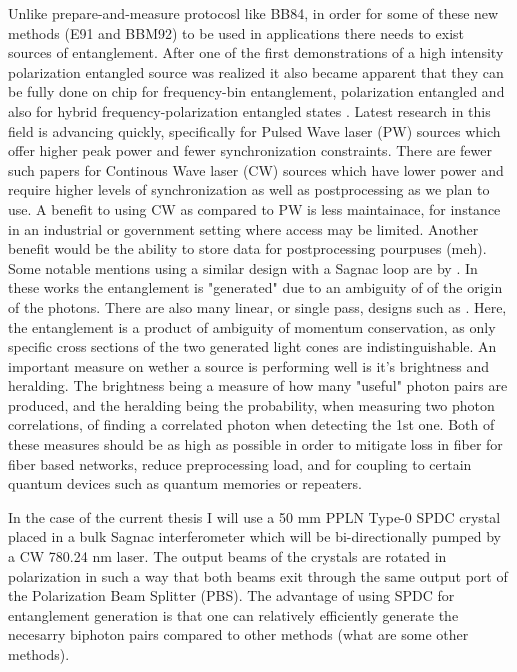 \documentclass{article}
\theoremstyle{mytheoremstyle}
\theoremstyle{mytheoremstyle}
\theoremstyle{myproblemstyle}
\begin{document}
Unlike prepare-and-measure protocosl like BB84, in order for some of these new methods (E91 and BBM92) to be used in applications there needs to exist sources of entanglement.
After one of the first \cite{Kwiat_1995} demonstrations of a high intensity polarization entangled source was realized it also became
apparent that they can be fully done on chip \cite{S_G_S_C_F_B_L_G_B_2022} for frequency-bin entanglement, polarization entangled \cite{L_Z_F_F_L_L_W_R_D_X_etal._2017}
and also for hybrid frequency-polarization entangled states \cite{F_R_D_F_L_M_A_B_D_2023}.
Latest research in this field is advancing quickly, specifically for Pulsed Wave laser (PW) sources which offer higher peak
power and fewer synchronization constraints. There are fewer such papers for Continous Wave laser (CW) sources which have
lower power and require higher levels of synchronization as
well as postprocessing as we plan to use. A benefit to using CW as compared to PW is less maintainace, for instance in an industrial or government
setting where access may be limited. Another benefit would be the ability to store data for postprocessing pourpuses (meh).
Some notable mentions using a similar design with a Sagnac loop are by
\cite{Neumann_Buchner_Bulla_Bohmann_Ursin_2022_PW,Chen_Ecker_Wengerowsky_Bulla_Joshi_Steinlechner_Ursin_2018_CW}.
In these works the entanglement is "generated" due to an ambiguity of of the origin of the photons.
There are also many linear, or single pass, designs such as \cite{Lee_Kim_Cha_Moon_2016,Kwiat_Mattle_Weinfurter_Zeilinger_Sergienko_Shih_1995}.
Here, the entanglement is a product of ambiguity of momentum conservation, as only specific cross sections of the two generated light cones are indistinguishable.
An important measure on wether a source is performing well is it's brightness and heralding. The brightness being a measure of how many "useful" photon pairs are produced,
and the heralding being the probability, when measuring two photon correlations, of finding a correlated photon when detecting the 1st one.
Both of these measures should be as high as possible in order to mitigate loss in fiber for fiber based networks,
reduce preprocessing load, and for coupling to certain quantum devices such as quantum memories or repeaters.

In the case of the current thesis I will use a 50 mm PPLN Type-0 SPDC crystal placed in a bulk Sagnac interferometer which will be bi-directionally pumped by a CW 780.24 nm laser.
The output beams of the crystals are rotated in polarization in such a way that both beams exit through the same output port of the Polarization Beam Splitter (PBS).
The advantage of using SPDC for entanglement generation is that one can relatively efficiently generate the necesarry biphoton pairs compared to other methods (what are some other methods).
\end{document}
